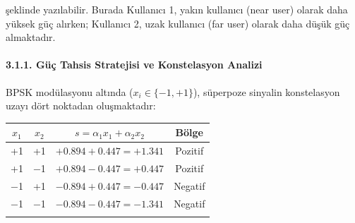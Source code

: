 \documentclass[
]{IEEEtran}
\newcounter{none} %
\begin{document}
\begin{longtable}[]
şeklinde yazılabilir. Burada Kullanıcı 1, yakın kullanıcı (near user)
olarak daha yüksek güç alırken; Kullanıcı 2, uzak kullanıcı (far user)
olarak daha düşük güç almaktadır.

\paragraph{3.1.1. Güç Tahsis Stratejisi ve Konstelasyon
Analizi}\label{guxfcuxe7-tahsis-stratejisi-ve-konstelasyon-analizi}

BPSK modülasyonu altında (\(x_i \in \{-1, +1\}\)), süperpoze sinyalin
konstelasyon uzayı dört noktadan oluşmaktadır:

\begin{longtable}[]{@{}cccc@{}}
\toprule
\(x_1\) & \(x_2\) & \(s = \alpha_1 x_1 + \alpha_2 x_2\) & Bölge \\
\midrule
\bottomrule
+1 & +1 & \(+0.894 + 0.447 = +1.341\) & Pozitif \\
+1 & −1 & \(+0.894 − 0.447 = +0.447\) & Pozitif \\
−1 & +1 & \(−0.894 + 0.447 = −0.447\) & Negatif \\
−1 & −1 & \(−0.894 − 0.447 = −1.341\) & Negatif \\
\end{tabular
}

Bu konstelasyon yapısında, sıfır karar eşiği (\(\text{threshold} = 0\))
kullanılarak Kullanıcı 1'in (\(x_1\)) sembol kararı güvenilir bir
şekilde verilebilmektedir; zira \(\alpha_1 > \alpha_2\) koşulu, tüm
olası \(s\) değerlerinin \(x_1\)'in işaretiyle aynı yönde kalmasını
garanti etmektedir. Bu özellik, SIC'nin ilk aşamasında güçlü
kullanıcının doğru çözülmesinin temelini oluşturmaktadır.

\subsubsection{3.2. AWGN Kanal Modeli}\label{awgn-kanal-modeli}

Verici çıkışından alıcı girişine kadar olan iletim kanalı, Toplamsal
Beyaz Gauss Gürültüsü (AWGN) modeli ile temsil edilmektedir:

\[r(t) = h \cdot s(t) + n(t)\]

Burada: - \(h\): Kanal katsayısı (bu projede \(h = 1.0\), düz
sönümleme), - \(n(t)\): Sıfır ortalamalı ve \(\sigma_n^2\) varyanslı
karmaşık Gauss gürültüsü.

GNU Radio'daki \texttt{Channel\ Model} bloğunda konfigüre edilen
parametreler:


\end{longtable}
\end{longtable}
\end{document}
